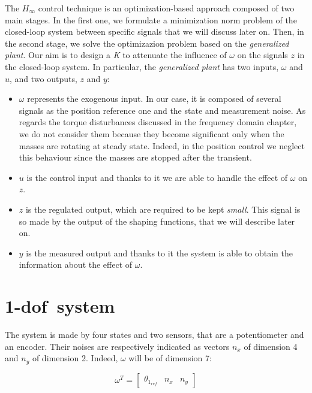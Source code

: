 The ${H_{\infty}}$ control technique is an optimization-based approach composed of two main stages. In the first one, we formulate a minimization norm problem of the closed-loop system between specific signals that we will discuss later on. Then, in the second stage, we solve the optimizazion problem based on the \textit{generalized plant}.
\newline
Our aim is to design a \textit{K} to attenuate the influence of $\omega$ on the signals $z$ in the closed-loop system. In particular, the \textit{generalized plant} has two inputs, $\omega$ and $u$, and two outputs, $z$ and $y$:
\begin{itemize}
	\item \boldmath$\omega$ represents the exogenous input. In our case, it is composed of several signals as the position reference one and the state and measurement noise. As regards the torque disturbances discussed in the frequency domain chapter, we do not consider them because they become significant only when the masses are rotating at steady state. Indeed, in the position control we neglect this behaviour since the masses are stopped after the transient.
	\item \boldmath$u$ is the control input and thanks to it we are able to handle the effect of $\omega$ on $z$.
	\item \boldmath$z$ is the regulated output, which are required to be kept \textit{small}. This signal is so made by the output of the shaping functions, that we will describe later on.
	\item \boldmath$y$ is the measured output and thanks to it the system is able to obtain the information about the effect of $\omega$.
\end{itemize}

\section{\acrshort{1-dof}\ system}
The system is made by four states and two sensors, that are a potentiometer and an encoder. Their noises are respectively indicated as vectors $n_x$ of dimension 4 and $n_y$ of dimension 2. Indeed, $\omega$ will be of dimension 7:

\begin{equation}
	\omega^{T} =
	\begin{bmatrix}
		\theta_{1_{ref}} & n_x & n_y
	\end{bmatrix}
\end{equation}

